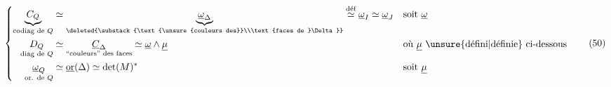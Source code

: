 \[
\left\{\begin{aligned}
\underbrace{C_Q}_{\text{codiag de }Q}&\simeq
\underbrace{\underline\omega_\Delta}_{\deleted{\substack{\text{\unsure{couleurs des}}\\\text{faces de }\Delta}}}
\overset{\text{déf}}{\simeq}\underline\omega_I\simeq\underline\omega_J
&&\text{soit }\underline\omega\\
\underset{\text{diag de }Q}{D_Q}&\simeq
\underset{\text{\textquotedblleft couleurs\textquotedblright\ des faces}}{\underline C_\Delta}
\simeq\underline\omega\wedge\underline\mu
&&\text{où }\underline\mu\ \text{\unsure{défini|définie} ci-dessous}\\
\underset{\text{or. de }Q}{\underline\omega_Q}&\simeq\underline{\mathrm{or}}(\Delta)
\simeq\det(M)^* &&\text{soit }\underline\mu
\end{aligned}\right. \tag*{(50)}
\]
